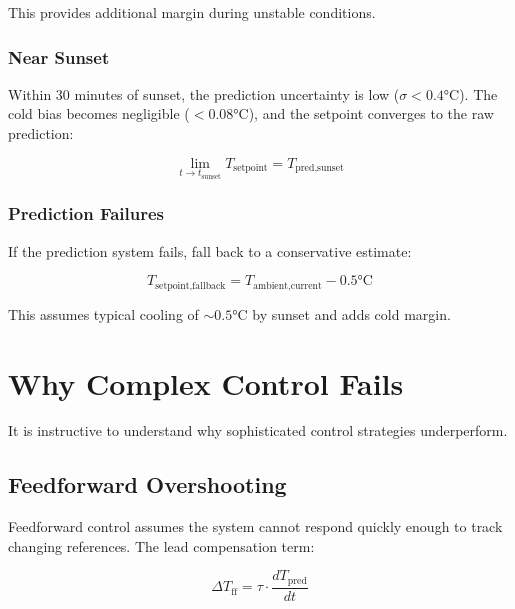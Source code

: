 \documentclass[11pt,letterpaper]{article}
\begin{document}
This provides additional margin during unstable conditions.

\subsubsection{Near Sunset}

Within 30 minutes of sunset, the prediction uncertainty is low ($\sigma < 0.4$°C). The cold bias becomes negligible ($< 0.08$°C), and the setpoint converges to the raw prediction:

\begin{equation}
\lim_{t \to t_{\text{sunset}}} T_{\text{setpoint}} = T_{\text{pred,sunset}}
\end{equation}

\subsubsection{Prediction Failures}

If the prediction system fails, fall back to a conservative estimate:

\begin{equation}
T_{\text{setpoint,fallback}} = T_{\text{ambient,current}} - 0.5\text{°C}
\end{equation}

This assumes typical cooling of $\sim 0.5$°C by sunset and adds cold margin.

\section{Why Complex Control Fails}

It is instructive to understand why sophisticated control strategies underperform.

\subsection{Feedforward Overshooting}

Feedforward control assumes the system cannot respond quickly enough to track changing references. The lead compensation term:

\begin{equation}
\Delta T_{\text{ff}} = \tau \cdot \frac{dT_{\text{pred}}}{dt}
\end{equation}
\end{document}
